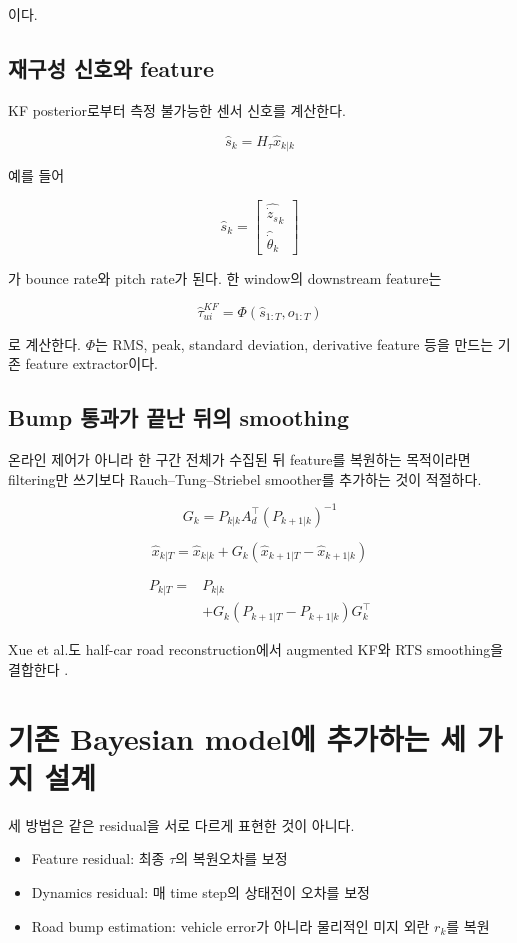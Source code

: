 \documentclass[letterpaper,10pt,journal,twocolumn]{ieeeconf}
\begin{document}
이다.

\subsection{재구성 신호와 feature}

KF posterior로부터 측정 불가능한 센서 신호를 계산한다.

\[
\hat s_k
=
H_\tau\hat x_{k|k}
\]

예를 들어

\[
\hat s_k
=
\begin{bmatrix}
\widehat{\dot z_s}_k\\
\widehat{\dot\theta}_k
\end{bmatrix}
\]

가 bounce rate와 pitch rate가 된다. 한 window의 downstream feature는

\[
\hat\tau_{ui}^{KF}
=
\Phi
\left(
\hat s_{1:T},o_{1:T}
\right)
\]

로 계산한다. \(\Phi\)는 RMS, peak, standard deviation, derivative feature 등을 만드는 기존 feature extractor이다.

\subsection{Bump 통과가 끝난 뒤의 smoothing}

온라인 제어가 아니라 한 구간 전체가 수집된 뒤 feature를 복원하는 목적이라면 filtering만 쓰기보다 Rauch--Tung--Striebel smoother를 추가하는 것이 적절하다.

\[
G_k
=
P_{k|k}A_d^\top
\left(P_{k+1|k}\right)^{-1}
\]

\[
\hat x_{k|T}
=
\hat x_{k|k}
+G_k
\left(
\hat x_{k+1|T}-\hat x_{k+1|k}
\right)
\]

\[
\begin{aligned}
P_{k|T}
={}&P_{k|k}\\
&+G_k
\left(P_{k+1|T}-P_{k+1|k}\right)
G_k^\top
\end{aligned}
\]

Xue et al.도 half-car road reconstruction에서 augmented KF와 RTS smoothing을 결합한다 \cite{xue2020}.

\section{기존 Bayesian model에 추가하는 세 가지 설계}

세 방법은 같은 residual을 서로 다르게 표현한 것이 아니다.

\begin{itemize}

\item
  Feature residual: 최종 \(\tau\)의 복원오차를 보정
\item
  Dynamics residual: 매 time step의 상태전이 오차를 보정
\item
  Road bump estimation: vehicle error가 아니라 물리적인 미지 외란 \(r_k\)를 복원
\end{itemize}
\end{document}
